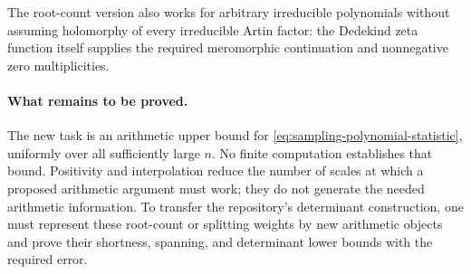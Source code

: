 The root-count version also works for arbitrary irreducible
polynomials without assuming holomorphy of every irreducible Artin
factor: the Dedekind zeta function itself supplies the required
meromorphic continuation and nonnegative zero multiplicities.

\paragraph{What remains to be proved.}
The new task is an arithmetic upper bound for
\eqref{eq:sampling-polynomial-statistic}, uniformly over all sufficiently
large $n$. No finite computation establishes that bound. Positivity
and interpolation reduce the number of scales at which a proposed
arithmetic argument must work; they do not generate the needed
arithmetic information. To transfer the repository's determinant
construction, one must represent these root-count or splitting
weights by new arithmetic objects and prove their shortness,
spanning, and determinant lower bounds with the required error.
